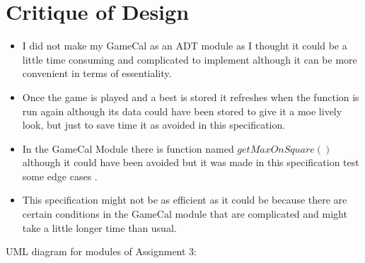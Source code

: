 \documentclass[12pt]{article}
\begin{document}
\newpage

\section*{Critique of Design}

\begin{itemize}
  \item I did not make my GameCal as an ADT module as I thought it could be a little time consuming and complicated to implement although it can be more convenient in terms of essentiality. 
  
  \item Once the game is played and a best is stored it refreshes when the function is run again although its data could have been stored to give it a moe lively look, but just to save time it as avoided in this specification.
  \item In the GameCal Module there is function named $getMaxOnSquare()$ although it could have been avoided but it was made in this specification test some edge cases .
  \item This specification might not be as efficient as it could be because there are certain conditions in the GameCal module that are complicated and might take a little longer time than usual.
  
  
\end{itemize}

\noindent UML diagram for modules of Assignment 3:
\end{document}
